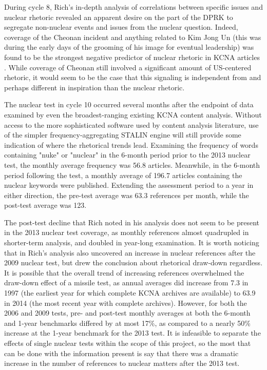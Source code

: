 \documentclass{article}
\begin{document}
During cycle 8, Rich's in-depth analysis of correlations between specific issues and nuclear rhetoric revealed an apparent desire on the part of the DPRK to segregate non-nuclear events and issues from the nuclear question. Indeed, coverage of the Cheonan incident and anything related to Kim Jong Un (this was during the early days of the grooming of his image for eventual leadership) was found to be the strongest negative predictor of nuclear rhetoric in KCNA articles \cite{rich12}. While coverage of Cheonan still involved a significant amount of US-centered rhetoric\cite{sin}, it would seem to be the case that this signaling is independent from and perhaps different in inspiration than the nuclear rhetoric.

The nuclear test in cycle 10 occurred several months after the endpoint of data examined by even the broadest-ranging existing KCNA content analysis\cite{rich14}. Without access to the more sophisticated software used by content analysis literature, use of the simpler frequency-aggregating STALIN engine will still provide some indication of where the rhetorical trends lead. Examining the frequency of words containing "nuke" or "nuclear" in the 6-month period prior to the 2013 nuclear test, the monthly average frequency was 56.8 articles. Meanwhile, in the 6-month period following the test, a monthly average of 196.7 articles containing the nuclear keywords were published. Extending the assessment period to a year in either direction, the pre-test average was 63.3 references per month, while the post-test average was 123.

The post-test decline that Rich\cite{rich14} noted in his analysis does not seem to be present in the 2013 nuclear test coverage, as monthly references almost quadrupled in shorter-term analysis, and doubled in year-long examination. It is worth noticing that in Rich's analysis also uncovered an increase in nuclear references after the 2009 nuclear test, but drew the conclusion about rhetorical draw-down regardless. It is possible that the overall trend of increasing references overwhelmed the draw-down effect of a missile test, as annual averages did increase from 7.3 in 1997 (the earliest year for which complete KCNA archives are available) to 63.9 in 2014 (the most recent year with complete archives). However, for both the 2006 and 2009 tests, pre- and post-test monthly averages at both the 6-month and 1-year benchmarks differed by at most 17\%, as compared to a nearly 50\% increase at the 1-year benchmark for the 2013 test. It is infeasible to separate the effects of single nuclear tests within the scope of this project, so the most that can be done with the information present is say that there was a dramatic increase in the number of references to nuclear matters after the 2013 test.
\end{document}
